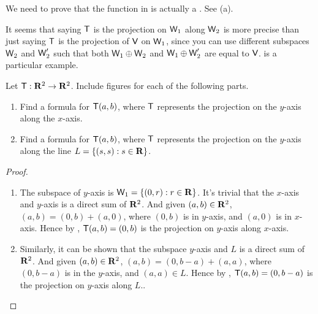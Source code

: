 \begin{note}
We need to prove that the function in  is actually a \LTRAN{}.
See (a).
\end{note}

\begin{note}
It seems that saying \(\textsf{T}\) is the projection on \(\textsf{W}_1\) along \(\textsf{W}_2\) is more precise than just saying \(\textsf{T}\) is the projection of \(\textsf{V}\) on \(\textsf{W}_1\), since you can use different subspaces \(\textsf{W}_2\) and \(\textsf{W}_2'\) such that both \(\textsf{W}_1 \oplus \textsf{W}_2\) and \(\textsf{W}_1 \oplus \textsf{W}_2'\) are equal to \(\textsf{V}\).
 is a particular example.
\end{note}

\begin{exercise} \label{exercise 2.1.25}
Let \(\textsf{T} : \mathbf{R}^2 \to \mathbf{R}^2\).
Include figures for each of the following parts.
\begin{enumerate}
\item Find a formula for \(\textsf{T}(a, b)\), where \(\textsf{T}\) represents the projection on the \(y\)-axis along the \(x\)-axis.
\item Find a formula for \(\textsf{T}(a, b)\), where \(\textsf{T}\) represents the projection on the \(y\)-axis along the line \(L = \{(s, s): s \in \mathbf{R} \}\).
\end{enumerate} 
\end{exercise}

\begin{proof} \ 

\begin{enumerate}
\item The subspace of \(y\)-axis is \(\textsf{W}_1 = \{ (0, r) : r \in \mathbf{R} \}\).
    It's trivial that the \(x\)-axis and \(y\)-axis is a direct sum of \(\mathbf{R}^2\).
    And given \((a, b) \in \mathbf{R}^2\), \((a, b) = (0, b) + (a, 0)\), where \((0, b)\) is in \(y\)-axis, and \((a, 0)\) is in \(x\)-axis.
    Hence by , \(\textsf{T}(a, b) = (0, b)\) is the projection on \(y\)-axis along \(x\)-axis.

\item Similarly, it can be shown that the subspace \(y\)-axis and \(L\) is a direct sum of \(\mathbf{R}^2\).
    And given \((a, b) \in \mathbf{R}^2\), \((a, b) = (0, b - a) + (a, a)\), where \((0, b - a)\) is in the \(y\)-axis, and \((a, a) \in L\).
    Hence by , \(\textsf{T}(a, b) = (0, b - a)\) is the projection on \(y\)-axis along \(L\)..
\end{enumerate}
\end{proof}

